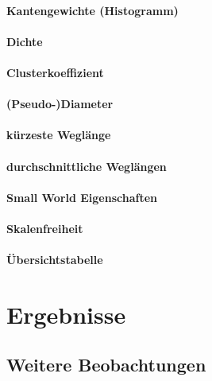 \documentclass[12pt]{article}
\begin{document}
\paragraph{Kantengewichte (Histogramm)}

\paragraph{Dichte}

\paragraph{Clusterkoeffizient}

\paragraph{(Pseudo-)Diameter}

\paragraph{k\"urzeste Wegl\"ange}

\paragraph{durchschnittliche Wegl\"angen}

\paragraph{Small World Eigenschaften}

\paragraph{Skalenfreiheit}

\paragraph{Übersichtstabelle}



\section{Ergebnisse}

\subsection{Weitere Beobachtungen}
\end{document}
